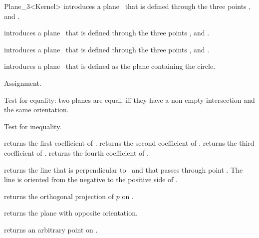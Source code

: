 \begin{ccRefClass} {Plane_3<Kernel>}
{introduces a plane \ccVar\ that is defined through the  three points 
 ,  and .}

{introduces a plane \ccVar\ that is defined through the  three points 
 ,  and .}

{introduces a plane \ccVar\ that is defined through the  three points 
 ,  and .}

{introduces a plane \ccVar\ that is defined as the plane containing
  the circle.}

\ccOperations
\ccHidden {}
        {Assignment.}

       {Test for equality: two planes are equal, iff they have a non 
        empty intersection and the same orientation.}

       {Test for inequality.}

       {returns the first coefficient of \ccVar.}
\ccGlue
{}
       {returns the second coefficient of \ccVar.}
\ccGlue
{}
       {returns the third coefficient of \ccVar.}
\ccGlue
{}
       {returns the fourth coefficient of \ccVar.}

       {returns the line that is perpendicular to \ccVar\ and that
        passes through point . The line is oriented from
        the negative to the positive side of \ccVar.}

       {returns the orthogonal projection of $p$ on \ccVar.}

       {returns the plane with opposite orientation.}

       {returns an arbitrary point on \ccVar.}


\end{ccRefClass}
